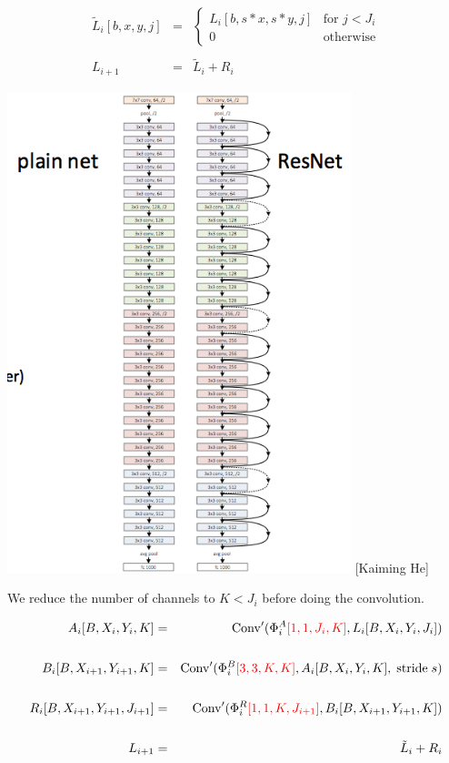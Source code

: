 {\vfill
\begin{eqnarray*}
\tilde{L}_i[b,x,y,j] & = & \left\{\begin{array}{ll} L_i[b,s*x,s*y,j] & \mbox{for $j < J_i$} \\ 0 & \mbox{otherwise} \end{array}\right.\\
\\
L_{i+1} & = & \tilde{L}_i  + R_i
\end{eqnarray*}


\centerline{\includegraphics[height= 5.5in]{../images/ResnetStack} {\large [Kaiming He]}}


We reduce the number of channels to $K < J_i$ before doing the convolution.

{\huge
\begin{eqnarray*}
A_i[B,X_i,Y_i,K] & = & \mathrm{Conv}'(\Phi_i^A{\color{red} [1,1,J_i,K]},L_i[B,X_i,Y_i,J_i]) \\
\\
B_i[B,X_{i+1},Y_{i+1},K] & = & \mathrm{Conv}'(\Phi_i^B{\color{red}[3,3,K,K]},A_i[B,X_i,Y_i,K],\;\mathrm{stride}\;s) \\
\\
R_i[B,X_{i+1},Y_{i+1},J_{i+1}] & = & \mathrm{Conv}'(\Phi_i^R{\color{red} [1,1,K,J_{i+1}]},B_i[B,X_{i+1},Y_{i+1},K]) \\
\\
L_{i+1} & = & \tilde{L}_i + R_i
\end{eqnarray*}
}

}
